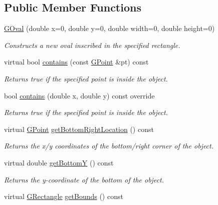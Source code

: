 \subsection*{Public Member Functions}
\begin{DoxyCompactItemize}
\item 
\mbox{\hyperlink{classsgl_1_1GOval_a0dc1da9139884a189b3fd0882c638bfc}{G\+Oval}} (double x=0, double y=0, double width=0, double height=0)
\begin{DoxyCompactList}\small\item\em Constructs a new oval inscribed in the specified rectangle. \end{DoxyCompactList}\item 
virtual bool \mbox{\hyperlink{classsgl_1_1GObject_a1dbc9dafaae51958112dbe1267a1f547}{contains}} (const \mbox{\hyperlink{structsgl_1_1GPoint}{G\+Point}} \&pt) const
\begin{DoxyCompactList}\small\item\em Returns {\ttfamily true} if the specified point is inside the object. \end{DoxyCompactList}\item 
bool \mbox{\hyperlink{classsgl_1_1GOval_ad973a1d55799d3a73bf8b04986cd804e}{contains}} (double x, double y) const override
\begin{DoxyCompactList}\small\item\em Returns {\ttfamily true} if the specified point is inside the object. \end{DoxyCompactList}\item 
virtual \mbox{\hyperlink{structsgl_1_1GPoint}{G\+Point}} \mbox{\hyperlink{classsgl_1_1GObject_a0d41183bf6b08de66fe3907551aab0d7}{get\+Bottom\+Right\+Location}} () const
\begin{DoxyCompactList}\small\item\em Returns the x/y coordinates of the bottom/right corner of the object. \end{DoxyCompactList}\item 
virtual double \mbox{\hyperlink{classsgl_1_1GObject_a4316a2406c18e1c6d061fe51fd355490}{get\+BottomY}} () const
\begin{DoxyCompactList}\small\item\em Returns the {\itshape y}-\/coordinate of the bottom of the object. \end{DoxyCompactList}\item 
virtual \mbox{\hyperlink{structsgl_1_1GRectangle}{G\+Rectangle}} \mbox{\hyperlink{classsgl_1_1GObject_a29e6ac35a0b48f491a4c88194cc5da3b}{get\+Bounds}} () const

\end{DoxyCompactItemize}
